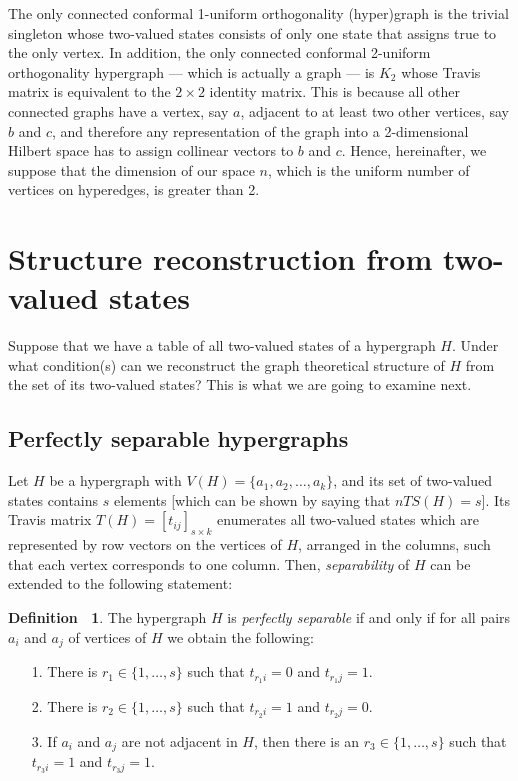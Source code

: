 \documentclass[%
12pt,
prereprint,
showpacs,
showkeys,
preprintnumbers,
amsmath,amssymb,
aps,
pra,
longbibliography,
notitlepage
]{revtex4-1}
\theoremstyle{definition}
\newtheorem{definition}[theorem]{{\color{THM}Definition\ }}
\begin{document}
	
	The only connected conformal 1-uniform orthogonality (hyper)graph is the trivial singleton whose two-valued states consists of only one state that assigns true to the only vertex. In addition, the only connected conformal 2-uniform orthogonality hypergraph --- which is actually a graph --- is $K_2$ whose Travis matrix is equivalent to the $2\times 2$ identity matrix. This is because all other connected graphs have a vertex, say $a$, adjacent to at least two other vertices, say $b$ and $c$, and therefore any representation of the graph into a 2-dimensional Hilbert space has to assign collinear vectors to $b$ and $c$. Hence, hereinafter, we suppose that the dimension of our space $n$, which is the uniform number of vertices on hyperedges, is greater than 2.
	
	
	
	
	
	\section{Structure reconstruction from two-valued states}\label{construction-conj}
	
	Suppose that we have a table of all two-valued states of a hypergraph $H$. Under what condition(s) can we reconstruct the graph theoretical structure of $H$  from the set of its two-valued states?  This is what we are going to examine next.
	
	\subsection{Perfectly separable hypergraphs}
	
	Let $H$ be a hypergraph with $V(H)=\{a_1, a_2,\ldots, a_k\}$, and its set of two-valued states contains $s$ elements [which can be shown by saying that $nTS(H)=s$]. Its Travis matrix $T(H) =[t_{ij}]_{s\times k}$ enumerates all two-valued states which are represented by row vectors on the vertices of $H$, arranged in the columns, such that each vertex corresponds to one column. Then, \emph{separability} of $H$ can be extended to the following statement:
	
	\begin{definition}\label{separability}
		The hypergraph $H$ is \emph{perfectly separable} if and only if for all pairs $a_i$ and $a_j$ of vertices of $H$ we obtain the following:
		\begin{itemize}
			\item[1.] There is $r_1 \in \{1,\ldots,s\}$ such that $t_{r_1 i}=0$ and $t_{r_1 j}=1$.
			\item[2.] There is $r_2 \in \{1,\ldots,s\}$  such that $t_{r_2 i}=1$ and $t_{r_2 j}=0$.
			\item[3.] If $a_i$ and $a_j$ are not adjacent in $H$, then there is an $r_3 \in \{1,\ldots,s\}$  such that $t_{r_3 i}=1$ and $t_{r_3 j}=1$.
		\end{itemize}
	\end{definition}
	
\end{document}
